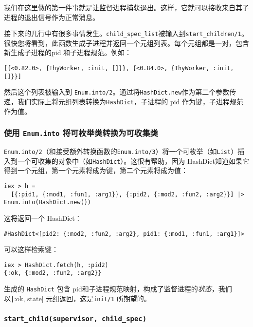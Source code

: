 我们在这里做的第一件事就是让监督进程捕获退出。这样，它就可以接收来自其子进程的退出信号作为正常消息。

接下来的几行中有很多事情发生。\texttt{child\_spec\_list}被输入到\texttt{start\_children/1}。
很快您将看到，此函数生成子进程并返回一个元组列表。每个元组都是一对，包含新生成子进程的pid 和子进程规范。例如：

\texttt{[\{<0.82.0>, \{ThyWorker, :init, []\}\}, \{<0.84.0>, \{ThyWorker, :init, []\}\}]}

然后这个列表被输入到 \texttt{Enum.into/2}。通过将\texttt{HashDict.new}作为第二个参数传递，我们实际上将元组列表转换为\texttt{HashDict}，子进程的 pid 作为键，子进程规范作为值。

\subsubsection{使用 \texttt{Enum.into} 将可枚举类转换为可收集类}

\texttt{Enum.into/2}（和接受额外转换函数的\texttt{Enum.into/3}）将一个可枚举（如\texttt{List}）插入到一个可收集的对象中（如\texttt{HashDict}）。这很有帮助，因为 HashDict知道如果它得到一个元组，第一个元素将成为键，第二个元素将成为值：

\begin{code}{}
\begin{verbatim}
iex > h =
  [{:pid1, {:mod1, :fun1, :arg1}}, {:pid2, {:mod2, :fun2, :arg2}}] |> Enum.into(HashDict.new())
\end{verbatim}
\end{code}

这将返回一个 HashDict：

\texttt{\#HashDict<[pid2: \{:mod2, :fun2, :arg2\}, pid1: \{:mod1, :fun1, :arg1\}]>}

可以这样检索键：

\begin{code}{}
\begin{verbatim}
iex > HashDict.fetch(h, :pid2)
{:ok, {:mod2, :fun2, :arg2}}
\end{verbatim}
\end{code}

生成的 \texttt{HashDict} 包含 pid和子进程规范映射，构成了监督进程的\emph{状态}，我们以\texttt|{:ok, state}| 元组返回，这是\texttt{init/1} 所期望的。

\subsubsection{\texttt{start\_child(supervisor, child\_spec)}}

